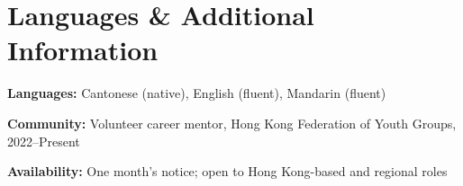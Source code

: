\documentclass[10pt,a4paper]{article}
\newcommand{\skillline}[2]{%
  \textbf{\color{navy}#1:} #2\par\vspace{0.18em}
}
\begin{document}
\section*{Languages \& Additional Information}
\skillline{Languages}{Cantonese (native), English (fluent), Mandarin (fluent)}
\skillline{Community}{Volunteer career mentor, Hong Kong Federation of Youth Groups, 2022--Present}
\skillline{Availability}{One month's notice; open to Hong Kong-based and regional roles}
\end{document}
